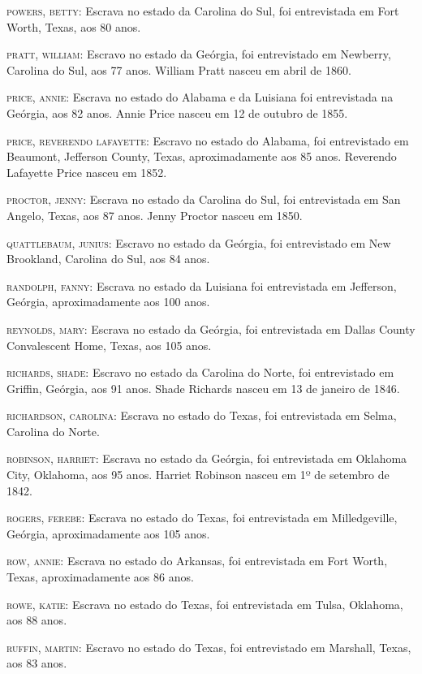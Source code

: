 \begin{Parskip}
\textsc{powers, betty:} Escrava no estado da Carolina do Sul, foi
entrevistada em Fort Worth, Texas, aos 80 anos.

\textsc{pratt, william:} Escravo no estado da Geórgia, foi entrevistado
em Newberry, Carolina do Sul, aos 77 anos. William Pratt nasceu em abril
de 1860.

\textsc{price, annie:} Escrava no estado do Alabama e da Luisiana foi
entrevistada na Geórgia, aos 82 anos. Annie Price nasceu em 12 de
outubro de 1855.

\textsc{price, reverendo lafayette:} Escravo no estado do Alabama, foi
entrevistado em Beaumont, Jefferson County, Texas, aproximadamente aos
85 anos. Reverendo Lafayette Price nasceu em 1852.

\textsc{proctor, jenny:} Escrava no estado da Carolina do Sul, foi
entrevistada em San Angelo, Texas, aos 87 anos. Jenny Proctor nasceu em
1850.

\textsc{quattlebaum, junius:} Escravo no estado da Geórgia, foi
entrevistado em New Brookland, Carolina do Sul, aos 84 anos.

\textsc{randolph, fanny:} Escrava no estado da Luisiana foi entrevistada
em Jefferson, Geórgia, aproximadamente aos 100 anos.

\textsc{reynolds, mary:} Escrava no estado da Geórgia, foi entrevistada
em Dallas County Convalescent Home, Texas, aos 105 anos.

\textsc{richards, shade:} Escravo no estado da Carolina do Norte, foi
entrevistado em Griffin, Geórgia, aos 91 anos. Shade Richards nasceu em
13 de janeiro de 1846.

\textsc{richardson, carolina:} Escrava no estado do Texas, foi
entrevistada em Selma, Carolina do Norte.

\textsc{robinson, harriet:} Escrava no estado da Geórgia, foi
entrevistada em Oklahoma City, Oklahoma, aos 95 anos. Harriet Robinson
nasceu em 1º de setembro de 1842.

\textsc{rogers, ferebe:} Escrava no estado do Texas, foi entrevistada em
Milledgeville, Geórgia, aproximadamente aos 105 anos.

\textsc{row, annie:} Escrava no estado do Arkansas, foi entrevistada em
Fort Worth, Texas, aproximadamente aos 86 anos.

\textsc{rowe, katie:} Escrava no estado do Texas, foi entrevistada em
Tulsa, Oklahoma, aos 88 anos.

\textsc{ruffin, martin:} Escravo no estado do Texas, foi entrevistado em
Marshall, Texas, aos 83 anos.


\end{Parskip}
